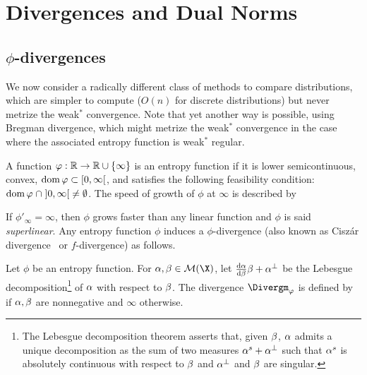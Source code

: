 \section{Divergences and Dual Norms}



\subsection{$\phi$-divergences}
\label{sec-phi-div}

We now consider a radically different class of methods to compare distributions, which are simpler to compute ($O(n)$ for discrete distributions) but never metrize the weak$^*$ convergence. 
%
Note that yet another way is possible, using Bregman divergence, which might metrize the weak$^*$ convergence in the case where the associated entropy function is weak$^*$ regular.

\begin{defn}
\label{def_entropy}
A function $\varphi : \mathbb{R} \to \mathbb{R} \cup \{\infty\}$ is an entropy function if it is lower semicontinuous, convex, $\operatorname{dom} \varphi\subset [0,\infty[$, and satisfies the following feasibility condition:  $\operatorname{dom} \varphi \; \cap\;  ]0, \infty[\; \neq \emptyset$. The speed of growth of $\phi$ at $\infty$ is described by %
\end{defn}

If $\phi'_\infty = \infty$, then $\phi$ grows faster than any linear function and $\phi$ is said \emph{superlinear}. Any entropy function $\phi$ induces a $\phi$-divergence (also known as Cisz\'ar divergence~\cite{ciszar1967information,ali1966general} or $f$-divergence) as follows.

\begin{defn}
\label{def_divergence}
Let $\phi$ be an entropy function.
For $\al,\be \in \Mm(\X)$, let $\frac{\mathrm{d} \alpha}{\mathrm{d} \beta} \beta + \alpha^{\perp}$ be the Lebesgue decomposition\footnote{The Lebesgue decomposition theorem asserts that, given $\beta$, $\alpha$ admits a unique decomposition as the sum of two measures $\alpha^s + \alpha^\perp$ such that $\alpha^s$ is absolutely continuous with respect to $\beta$ and $\alpha^\perp$ and $\beta$ are singular.} of $\alpha$ with respect to $\beta$. The divergence $\Divergm_\phi$ is defined by
if $\alpha,\beta$ are nonnegative and $\infty$ otherwise.
\end{defn}%

